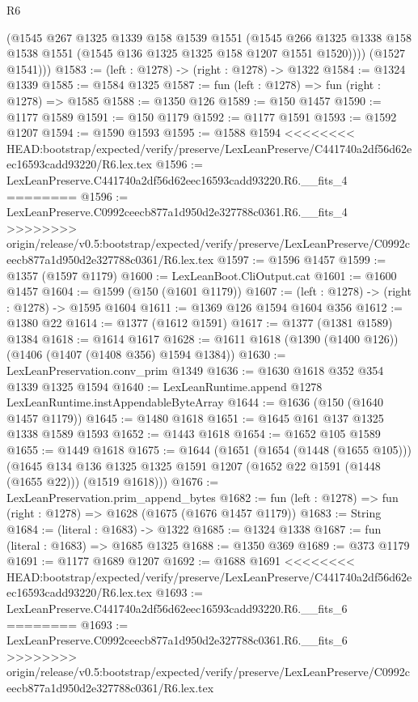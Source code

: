 \begin{lexlean}{R6}
\begin{coremodule}
{{{{{{{{{{{{{{{{{{{{{{{{{{{{{{{{{{{{{{{{{{{{{{{{{{          (@1545
            @267
            @1325
            @1339
            @158
            @1539
            @1551
            (@1545
              @266
              @1325
              @1338
              @158
              @1538
              @1551
              (@1545 @136 @1325 @1325 @158 @1207 @1551 @1520))))
        (@1527 @1541)))
@1583 := (left : @1278) -> (right : @1278) -> @1322
@1584 := @1324 @1339
@1585 := @1584 @1325
@1587 := fun (left : @1278) => fun (right : @1278) => @1585
@1588 := @1350 @126
@1589 := @150 @1457
@1590 := @1177 @1589
@1591 := @150 @1179
@1592 := @1177 @1591
@1593 := @1592 @1207
@1594 := @1590 @1593
@1595 := @1588 @1594
<<<<<<<< HEAD:bootstrap/expected/verify/preserve/LexLeanPreserve/C441740a2df56d62eec16593cadd93220/R6.lex.tex
@1596 := LexLeanPreserve.C441740a2df56d62eec16593cadd93220.R6.__fits_4
========
@1596 := LexLeanPreserve.C0992ceecb877a1d950d2e327788c0361.R6.__fits_4
>>>>>>>> origin/release/v0.5:bootstrap/expected/verify/preserve/LexLeanPreserve/C0992ceecb877a1d950d2e327788c0361/R6.lex.tex
@1597 := @1596 @1457
@1599 := @1357 (@1597 @1179)
@1600 := LexLeanBoot.CliOutput.cat
@1601 := @1600 @1457
@1604 := @1599 (@150 (@1601 @1179))
@1607 := (left : @1278) -> (right : @1278) -> @1595 @1604
@1611 := @1369 @126 @1594 @1604 @356
@1612 := @1380 @22
@1614 := @1377 (@1612 @1591)
@1617 := @1377 (@1381 @1589) @1384
@1618 := @1614 @1617
@1628 := @1611 @1618 (@1390 (@1400 @126)) (@1406 (@1407 (@1408 @356) @1594 @1384))
@1630 := LexLeanPreservation.conv_prim @1349
@1636 := @1630 @1618 @352 @354 @1339 @1325 @1594
@1640 := LexLeanRuntime.append @1278 LexLeanRuntime.instAppendableByteArray
@1644 := @1636 (@150 (@1640 @1457 @1179))
@1645 := @1480 @1618
@1651 := @1645 @161 @137 @1325 @1338 @1589 @1593
@1652 := @1443 @1618
@1654 := @1652 @105 @1589
@1655 := @1449 @1618
@1675 := @1644
    (@1651
      (@1654 (@1448 (@1655 @105)))
      (@1645 @134 @136 @1325 @1325 @1591 @1207 (@1652 @22 @1591 (@1448 (@1655 @22))) (@1519 @1618)))
@1676 := LexLeanPreservation.prim_append_bytes
@1682 := fun (left : @1278) => fun (right : @1278) => @1628 (@1675 (@1676 @1457 @1179))
@1683 := String
@1684 := (literal : @1683) -> @1322
@1685 := @1324 @1338
@1687 := fun (literal : @1683) => @1685 @1325
@1688 := @1350 @369
@1689 := @373 @1179
@1691 := @1177 @1689 @1207
@1692 := @1688 @1691
<<<<<<<< HEAD:bootstrap/expected/verify/preserve/LexLeanPreserve/C441740a2df56d62eec16593cadd93220/R6.lex.tex
@1693 := LexLeanPreserve.C441740a2df56d62eec16593cadd93220.R6.__fits_6
========
@1693 := LexLeanPreserve.C0992ceecb877a1d950d2e327788c0361.R6.__fits_6
>>>>>>>> origin/release/v0.5:bootstrap/expected/verify/preserve/LexLeanPreserve/C0992ceecb877a1d950d2e327788c0361/R6.lex.tex
}}}}}}}}}}}}}}}}}}}}}}}}}}}}}}}}}}}}}}}}}}}}}}}}}}
\end{coremodule}
\end{lexlean}
